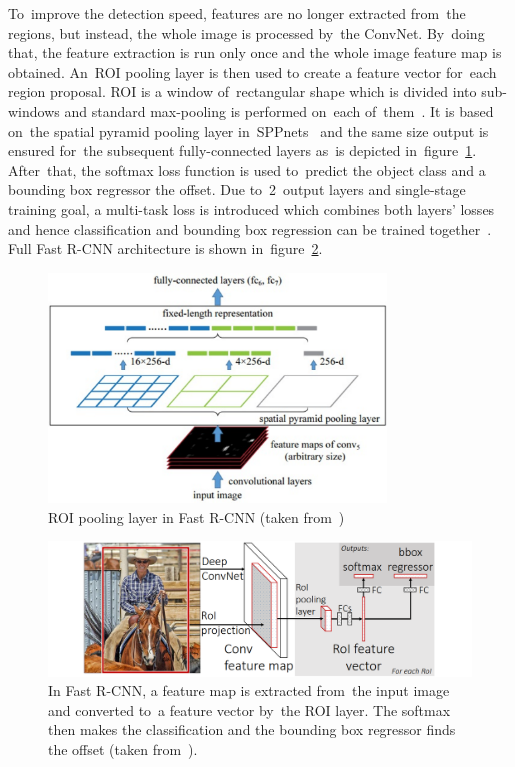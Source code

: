 To~improve the detection speed, features are no longer extracted from~the regions, but instead, the whole image is processed by~the ConvNet. By~doing that, the feature extraction is run only once and the whole image feature map is obtained. An~ROI pooling layer is then used to create a feature vector for~each region proposal. ROI is a window of~rectangular shape which is divided into sub-windows and standard max-pooling is performed on~each of~them~\cite{fast-rcnn}. It is based on~the spatial pyramid pooling layer in~SPPnets~\cite{sppnet} and the same size output is ensured for~the subsequent fully-connected layers as~is depicted in~figure~\ref{algorithms-fast-rcnn-roi}. After~that, the softmax loss function is used to~predict the object class and a bounding box regressor the offset. Due to~2~output layers and single-stage training goal, a multi-task loss is introduced which combines both layers' losses and hence classification and bounding box regression can be trained together~\cite{fast-rcnn}. Full Fast R-CNN architecture is shown in~figure~\ref{algorithms-fast-rcnn}.

\begin{figure}[hbt]
    \centering
    \includegraphics[width=0.8\textwidth]{img/algorithms/fast-rcnn-roi.png}
    \caption{ROI pooling layer in Fast R-CNN (taken from~\cite{hands-on-cnn})}
    \label{algorithms-fast-rcnn-roi}
\end{figure}

\begin{figure}[hbt]
    \includegraphics[width=1\textwidth]{img/algorithms/fast-rcnn.png}
    \caption{In Fast R-CNN, a feature map is extracted from~the input image and converted to~a feature vector by~the ROI layer. The softmax then makes the classification and the bounding box regressor finds the offset (taken from~\cite{fast-rcnn}).}
    \label{algorithms-fast-rcnn}
\end{figure}

